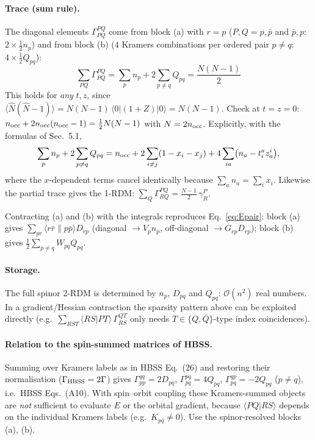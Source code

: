 \documentclass[11pt,a4paper]{article}
\newcommand{\kb}[1]{\bar{#1}}                 %
\newcommand{\asym}[4]{\langle #1 #2 \| #3 #4 \rangle}
\newcommand{\dir}[4]{\langle #1 #2 | #3 #4 \rangle}
\newcommand{\ev}[1]{\langle #1 \rangle}
\begin{document}
\paragraph{Trace (sum rule).} The diagonal elements $\Gamma^{PQ}_{PQ}$ come from block (a) with $r=p$
($P,Q=p,\kb p$ and $\kb p,p$: $2\times\tfrac12 n_p$) and from block (b) ($4$ Kramers combinations per
ordered pair $p\neq q$: $4\times\tfrac12 Q_{pq}$):
\begin{equation}
  \boxed{\;\sum_{PQ}\Gamma^{PQ}_{PQ}=\sum_p n_p+2\sum_{p\neq q}Q_{pq}=\frac{N(N-1)}{2}\;}
  \label{eq:trace}
\end{equation}
This holds for \emph{any} $t,z$, since $\ev{\hat N(\hat N-1)}=N(N-1)\,\langle 0|(1+Z)|0\rangle=N(N-1)$.
Check at $t=z=0$: $n_{\rm occ}+2n_{\rm occ}(n_{\rm occ}-1)=\tfrac12N(N-1)$ with $N=2n_{\rm occ}$.
Explicitly, with the formulas of Sec.~5.1,
\begin{equation}
  \sum_p n_p+2\sum_{p\neq q}Q_{pq}
  =n_{\rm occ}+2\sum_{i\neq j}(1-x_i-x_j)+4\sum_{ia}\bigl(n_a-t^a_iz^i_a\bigr),
\end{equation}
where the $x$-dependent terms cancel identically because $\sum_a n_a=\sum_i x_i$.
Likewise the partial trace gives the 1-RDM:
$\sum_{Q}\Gamma^{PQ}_{RQ}=\tfrac{N-1}{2}\,\gamma^{P}_{R}$.

Contracting (a) and (b) with the integrals reproduces Eq.~\eqref{eq:Epair}:
block (a) gives $\sum_{pr}\asym r{\kb r}p{\kb p}D_{rp}$ (diagonal $\to V_p n_p$, off-diagonal $\to G_{rp}D_{rp}$);
block (b) gives $\tfrac12\sum_{p\neq q}W_{pq}Q_{pq}$.

\paragraph{Storage.} The full spinor 2-RDM is determined by $n_p$, $D_{pq}$ and $Q_{pq}$:
$\mathcal O(n^2)$ real numbers. In a gradient/Hessian contraction the sparsity pattern above can be
exploited directly (e.g.\ $\sum_{RST}\dir RSPT\,\Gamma^{QT}_{RS}$ only needs $T\in\{Q,\kb Q\}$-type
index coincidences).

\paragraph{Relation to the spin-summed matrices of HBSS.} Summing over Kramers labels as in
HBSS Eq.~(26) and restoring their normalisation ($\Gamma_{\rm HBSS}=2\Gamma$) gives
$\Gamma^{qq}_{pp}=2D_{pq}$, $\Gamma^{pq}_{pq}=4Q_{pq}$, $\Gamma^{qp}_{pq}=-2Q_{pq}$ ($p\ne q$), i.e.\
HBSS Eqs.~(A10). With spin--orbit coupling these Kramers-summed objects are \emph{not} sufficient to
evaluate $E$ or the orbital gradient, because $\dir PQRS$ depends on the individual Kramers labels
(e.g.\ $K_{p\kb q}\neq 0$). Use the spinor-resolved blocks (a), (b).
\end{document}

